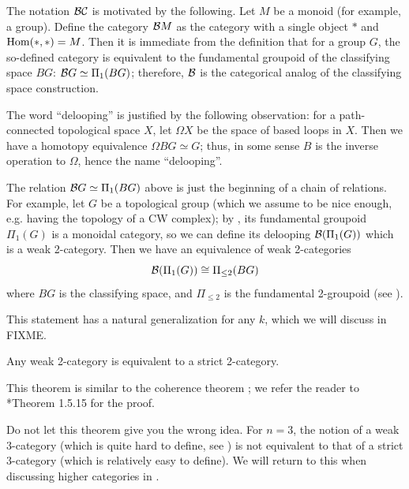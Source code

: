\begin{remark}\label{r:BG}
    The notation $\mathcal{B}\mathcal{C}$ is motivated by the following. Let $M$ be a
    monoid (for example, a group). Define the category $\mathcal{B} M$ as the
    category with a single object $*$ and $\operatorname{Hom}(*,*)=M$. Then it is immediate
    from the definition that for a group $G$, the so-defined category is
    equivalent to the fundamental groupoid of the classifying space $BG$:
    $\mathcal{B} G\simeq \Pi_1(BG)$; therefore, $\mathcal{B}$ is the categorical analog of
    the classifying space construction.

  The word ``delooping'' is justified by the following observation: for a
  path-connected topological space $X$, let $\Omega X$ be the space of based
  loops in $X$. Then we have a homotopy equivalence $\Omega BG \simeq G$; thus,
  in some sense $B$ is the inverse operation to $\Omega$, hence the name
  ``delooping''.

  The relation $\mathcal{B} G\simeq \Pi_1(BG)$ above is just the beginning of a chain
  of relations. For example, let $G$ be a topological
  group (which we assume to be nice enough, e.g. having the topology of a CW
  complex); by , its fundamental groupoid $\Pi_1(G)$ is a
  monoidal category, so we can define its delooping $\mathcal{B} (\Pi_1(G))$ which is
  a weak 2-category. Then we have an equivalence of weak 2-categories
  \begin{equation}
    \mathcal{B} (\Pi_1(G))\cong \Pi_{\le 2}(BG)
  \end{equation}
  where $BG$ is the classifying space, and $\Pi_{\le 2}$ is the fundamental
  2-groupoid (see ).

  This statement has a natural generalization for any $k$, which we will
  discuss in FIXME.
\end{remark}

\begin{theorem}\label{t:strictify-bicategories}
  Any weak 2-category is equivalent to a strict 2-category.
\end{theorem}
This theorem is similar to the coherence theorem ; we refer
the reader to *{Theorem 1.5.15} for the proof.

\begin{remark}\label{r:stictify-3-cat}
  Do not let this theorem give you the wrong idea. For $n=3$, the notion of a
  weak $3$-category (which is quite hard to define, see
  ) is not equivalent to that of a strict 3-category
  (which is relatively easy to define). We will return to this when discussing
  higher categories in .
\end{remark}


